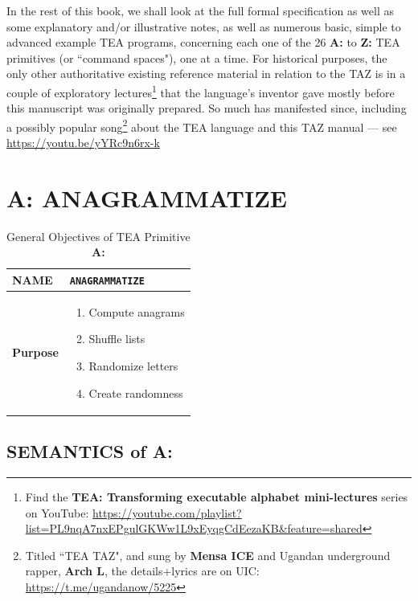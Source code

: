 \documentclass[a4paper, 18pt]{book} %
\begin{document}
In the rest of this book, we shall look at the full formal specification as well as some explanatory and/or illustrative notes, as well as numerous basic, simple to advanced example TEA programs, concerning each one of the 26 \textbf{A:} to \textbf{Z:} TEA primitives (or ``command spaces"), one at a time. For historical purposes, the only other authoritative existing reference material in relation to the TAZ is in a couple of exploratory lectures\footnote{Find the \textbf{TEA: Transforming executable alphabet mini-lectures} series on YouTube: \url{https://youtube.com/playlist?list=PL9nqA7nxEPgulGKWw1L9xEyqgCdEezaKB&feature=shared}} that the language’s inventor gave mostly before this manuscript was originally prepared. So much has manifested since, including a possibly popular song\footnote{Titled ``TEA TAZ", and sung by \textbf{Mensa ICE} and Ugandan underground rapper, \textbf{Arch L}, the details+lyrics are on UIC: \url{https://t.me/ugandanow/5225}} about the TEA language and this TAZ manual --- see \url{https://youtu.be/yYRc9n6rx-k}






\chapter{A: ANAGRAMMATIZE}
\label{CHAPA}


\begin{table}[H]
  \centering
  \LARGE
	\begin{tabular}[t]{|p{}|p{}}
 
	\textbf{NAME} & \texttt{ANAGRAMMATIZE}\\
	\hline
	\textbf{Purpose} & \begin{enumerate}
	\item Compute anagrams
	\item Shuffle lists
	\item Randomize letters
	\item Create randomness
	\end{enumerate}\\
	\hline
	              
\end{tabular}
\caption{General Objectives of TEA Primitive \textbf{A:}}
  \label{TABTAZA}
\end{table}


\section{SEMANTICS of A:}
\label{SECSEMA}
\end{document}
